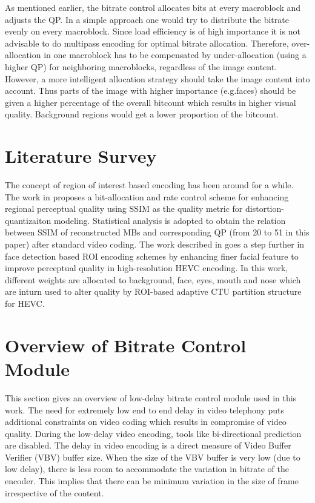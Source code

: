 \documentclass[11pt]{article} %
\begin{document}
 As mentioned earlier, the bitrate control allocates bits at every macroblock and adjusts the QP. In a simple approach one would try to distribute the bitrate evenly on every macroblock. Since load efficiency is of high importance it is not advisable to do multipass encoding for optimal bitrate allocation. Therefore, over-allocation in one macroblock has to be compensated by under-allocation (using a higher QP) for neighboring macroblocks, regardless of the image content. However, a more intelligent allocation strategy should take the image content into account. Thus parts of the image with higher importance (e.g.faces) should be given a higher percentage of the overall bitcount which results in higher visual quality. Background regions would get a lower proportion of the bitcount.

\section{Literature Survey}

The concept of region of interest based encoding has been around for a while.
The work in \cite{ROI-bit-allocation-h264} proposes a bit-allocation and rate control scheme for enhancing regional perceptual quality using SSIM as the quality metric for distortion-quantizaiton modeling. Statistical analysis is adopted to obtain the relation between SSIM of reconstructed MBs and corresponding QP (from 20 to 51 in this paper) after standard video coding.
The work described in \cite{Perception-model-of-face} goes a step further in face detection based ROI encoding schemes by enhancing finer facial feature to improve perceptual quality in high-resolution HEVC encoding. In this work, different weights are allocated to background, face, eyes, mouth and nose which are inturn used to alter quality by ROI-based adaptive CTU partition structure for HEVC. 

\section{Overview of Bitrate Control Module}
This section gives an overview of low-delay bitrate control module used in this work. The need for extremely low end to end delay in video telephony puts additional constraints on video coding which results in compromise of video quality. During the low-delay video encoding, tools like bi-directional prediction are disabled. The delay in video encoding is a direct measure of Video Buffer Verifier (VBV) buffer size. When the size of the VBV buffer is very low (due to low delay), there is less room to accommodate the variation in bitrate of the encoder. This implies that there can be minimum variation in the size of frame irrespective of the content.
 
\end{document}

